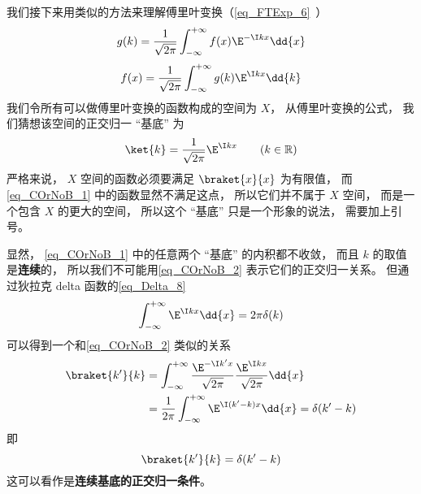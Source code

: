 我们接下来用类似的方法来理解傅里叶变换（\autoref{eq_FTExp_6}~）
\begin{equation}\label{eq_COrNoB_4}
g(k) = \frac{1}{\sqrt{2\pi }} \int_{-\infty }^{+\infty } f(x)\E^{-\I kx} \dd{x}
\end{equation}
\begin{equation}\label{eq_COrNoB_3}
f(x) = \frac{1}{\sqrt{2\pi }} \int_{-\infty }^{+\infty } g(k)\E^{\I kx} \dd{k}
\end{equation}
我们令所有可以做傅里叶变换的函数构成的空间为 $X$， 从傅里叶变换的公式， 我们猜想该空间的正交归一 “基底” 为
\begin{equation}\label{eq_COrNoB_1}
\ket{k} = \frac{1}{\sqrt{2\pi}} \E^{\I kx} \qquad (k \in \mathbb R)
\end{equation}
严格来说， $X$ 空间的函数必须要满足 $\braket{x}{x}$ 为有限值， 而\autoref{eq_COrNoB_1} 中的函数显然不满足这点， 所以它们并不属于 $X$ 空间， 而是一个包含 $X$ 的更大的空间， 所以这个 “基底” 只是一个形象的说法， 需要加上引号。

显然， \autoref{eq_COrNoB_1} 中的任意两个 “基底” 的内积都不收敛， 而且 $k$ 的取值是\textbf{连续}的， 所以我们不可能用\autoref{eq_COrNoB_2} 表示它们的正交归一关系。 但通过狄拉克 delta 函数的\autoref{eq_Delta_8}~
\begin{equation}
\int_{-\infty}^{+\infty} \E^{\I kx}\dd{x} = 2\pi \delta(k)
\end{equation}
可以得到一个和\autoref{eq_COrNoB_2} 类似的关系
\begin{equation}\label{eq_COrNoB_11}
\begin{aligned}
\braket{k'}{k} &= \int_{-\infty}^{+\infty} \frac{\E^{-\I k'x}}{\sqrt{2\pi}} \frac{\E^{\I kx}}{\sqrt{2\pi}}\dd{x}\\
&= \frac{1}{2\pi}\int_{-\infty}^{+\infty} \E^{\I (k'-k)x}\dd{x}
= \delta(k' - k)
\end{aligned}
\end{equation}
即
\begin{equation}\label{eq_COrNoB_8}
\braket{k'}{k} = \delta(k' - k)
\end{equation}
这可以看作是\textbf{连续基底的正交归一条件}。


